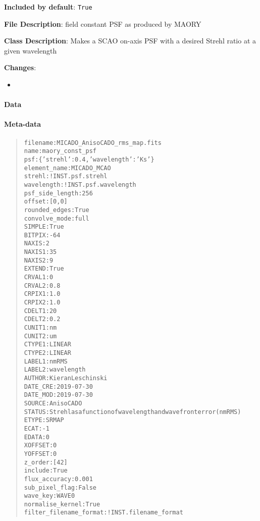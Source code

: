 \textbf{Included by default}: \texttt{True}

\textbf{File Description}: field constant PSF as produced by MAORY

\textbf{Class Description}: Makes a SCAO on-axis PSF with a desired Strehl ratio at a given wavelength

\textbf{Changes}:

\begin{itemize}
\item \end{itemize}


\paragraph{Data%
  \label{id1}%
}


\paragraph{Meta-data%
  \label{id2}%
}

\begin{quote}
\begin{alltt}
              filename : MICADO_AnisoCADO_rms_map.fits
                  name : maory_const_psf
                   psf : \{'strehl': 0.4, 'wavelength': 'Ks'\}
          element_name : MICADO_MCAO
                strehl : !INST.psf.strehl
            wavelength : !INST.psf.wavelength
       psf_side_length : 256
                offset : [0, 0]
         rounded_edges : True
         convolve_mode : full
                SIMPLE : True
                BITPIX : -64
                 NAXIS : 2
                NAXIS1 : 35
                NAXIS2 : 9
                EXTEND : True
                CRVAL1 : 0
                CRVAL2 : 0.8
                CRPIX1 : 1.0
                CRPIX2 : 1.0
                CDELT1 : 20
                CDELT2 : 0.2
                CUNIT1 : nm
                CUNIT2 : um
                CTYPE1 : LINEAR
                CTYPE2 : LINEAR
                LABEL1 : nmRMS
                LABEL2 : wavelength
                AUTHOR : Kieran Leschinski
              DATE_CRE : 2019-07-30
              DATE_MOD : 2019-07-30
                SOURCE : AnisoCADO
                STATUS : Strehl as a function of wavelength and wavefront error (nmRMS)
                 ETYPE : SRMAP
                  ECAT : -1
                 EDATA : 0
               XOFFSET : 0
               YOFFSET : 0
               z_order : [42]
               include : True
         flux_accuracy : 0.001
        sub_pixel_flag : False
              wave_key : WAVE0
      normalise_kernel : True
filter_filename_format : !INST.filename_format
\end{alltt}
\end{quote}
